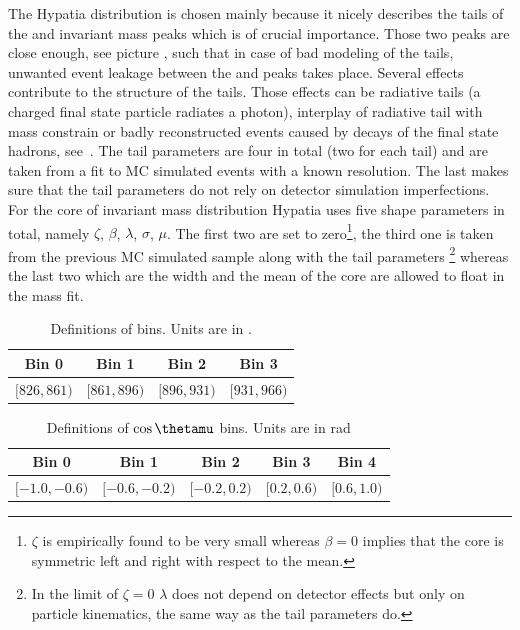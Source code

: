 The Hypatia distribution is chosen mainly because it nicely describes the tails of the \Bs and \Bd invariant mass peaks which is
of crucial importance. Those two peaks are close enough,
see picture , such that in case of bad modeling of the tails, unwanted event leakage between the \Bs and \Bd peaks 
takes place. Several effects contribute to the structure of the tails. Those effects can be radiative tails (a charged final state 
particle radiates a photon), interplay of radiative tail with \Jpsi mass constrain or badly reconstructed events caused by decays 
of the final state hadrons, see~\cite{Santos:2013gra}. The tail parameters are four in total (two for each tail) and are taken
from a fit to MC simulated events with a known resolution. The last makes sure that the tail parameters do not rely on detector 
simulation imperfections. For the core of invariant mass distribution Hypatia uses five shape parameters in total, namely $\zeta$, 
$\beta$, $\lambda$, $\sigma$, $\mu$. The first two are set to zero\footnote{$\zeta$ is empirically found to be very small whereas
$\beta = 0$ implies that the core is symmetric left and right with respect to the mean.}, the third one is taken from the previous
MC simulated sample along with the tail parameters \footnote{In the limit of $\zeta = 0$ $\lambda$ does not depend on detector 
effects but only on particle kinematics, the same way as the tail parameters do.} whereas the last two which are the width and 
the mean of the core are allowed to float in the mass fit.

\begin{table}[!h]
\centering
\begin{tabular}{c c c c}
  \hline
  Bin 0 & Bin 1 & Bin 2 & Bin 3\\
  \hline
  $ [826,861) $ & $ [861,896) $ & $ [896,931) $ & $ [931,966) $ \\
  \hline
\end{tabular}
\caption{Definitions of \mkpi bins. Units are in \mevcc.}
\label{Kbindef}
\end{table}

\begin{table}[!h]
\centering
\begin{tabular}{c c c c c}
  \hline
  Bin 0 & Bin 1 & Bin 2 & Bin 3 & Bin 4\\	
  \hline
  $ [-1.0,-0.6) $ & $ [-0.6,-0.2) $  & $ [-0.2,0.2) $ & $ [0.2,0.6) $ & $ [0.6,1.0) $ \\
  \hline
 \end{tabular}
\caption{Definitions of $\cos\thetamu$ bins. Units are in rad}
\label{cosThateMubindef} 
\end{table}

